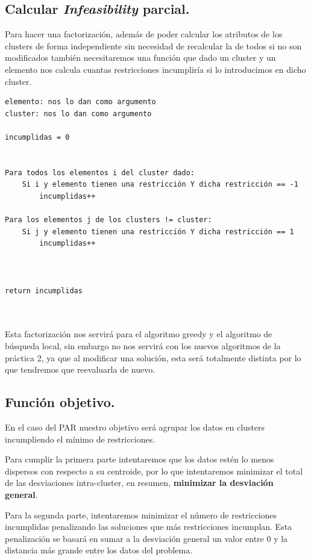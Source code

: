 \documentclass[12pt, spanish]{article}
\begin{document}
\newpage

\subsection{Calcular \textit{Infeasibility} parcial.}

Para hacer una factorización, además de poder calcular los atributos de los clusters de forma independiente sin necesidad de recalcular la de todos si no son modificados también necesitaremos una función que dado un cluster y un elemento nos calcula cuantas restricciones incumpliría si lo introducimos en dicho cluster.


\begin{lstlisting}
elemento: nos lo dan como argumento
cluster: nos lo dan como argumento

incumplidas = 0


Para todos los elementos i del cluster dado:
	Si i y elemento tienen una restricción Y dicha restricción == -1
		incumplidas++

Para los elementos j de los clusters != cluster:
	Si j y elemento tienen una restricción Y dicha restricción == 1
		incumplidas++



return incumplidas
	
	
\end{lstlisting}


Esta factorización nos servirá para el algoritmo greedy y el algoritmo de búsqueda local, sin embargo no nos servirá con los nuevos algoritmos de la práctica 2, ya que al modificar una solución, esta será totalmente distinta por lo que tendremos que reevaluarla de nuevo.

\newpage

\subsection{Función objetivo.}

En el caso del PAR nuestro objetivo será agrupar los datos en clusters incumpliendo el mínimo de restricciones.

Para cumplir la primera parte intentaremos que los datos estén lo menos dispersos con respecto a su centroide, por lo que intentaremos minimizar el total de las desviaciones intra-cluster, en resumen, \textbf{minimizar la desviación general}. 

Para la segunda parte, intentaremos minimizar el número de restricciones incumplidas penalizando las soluciones que más restricciones incumplan. Esta penalización se basará en sumar a la desviación general un valor entre 0 y la distancia más grande entre los datos del problema.
\end{document}
